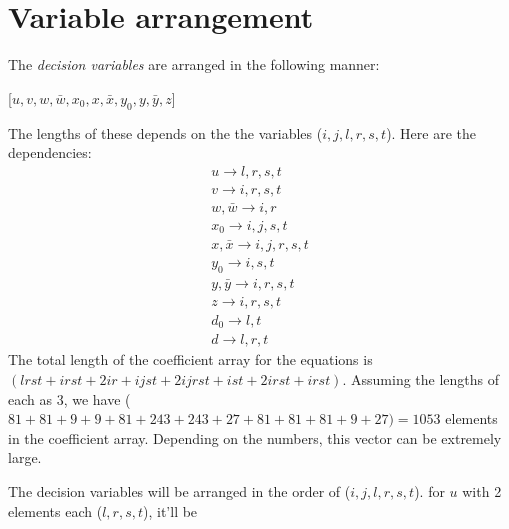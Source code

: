 \documentclass[11pt]{article}
\begin{document}
\section{Variable arrangement}
The \textit{decision variables} are arranged in the following manner:\\
\begin{center}
[$u, v, w, \bar{w}, x_0, x, \bar{x}, y_0, y, \bar{y}, z$]\\
\end{center}

\par \noindent The lengths of these depends on the the variables ($i, j, l, r, s, t$). Here are the dependencies:\\
\begin{align}
u \rightarrow l, r, s, t\\
v \rightarrow i, r, s, t\\
w, \bar{w} \rightarrow i, r\\
x_0 \rightarrow i,j,s,t\\
x, \bar{x}  \rightarrow i, j, r, s, t\\
y_0 \rightarrow i,s,t\\
y, \bar{y} \rightarrow i,r,s,t\\
z \rightarrow i, r, s, t\\
d_0 \rightarrow l, t\\
d \rightarrow l, r, t
\end{align}
The total length of the coefficient array for the equations is $(lrst + irst + 2ir + ijst + 2ijrst + ist + 2irst + irst)$. Assuming  the lengths of each as $3$, we have ($81+ 81 +9 + 9+ 81 +243 +243 + 27 + 81 + 81 +81 + 9 + 27)= 1053$ elements in the coefficient array. Depending on the numbers, this vector can be extremely large.

\par The decision variables will be arranged in the order of ($i, j, l, r, s, t$). for $u$ with 2 elements each ($l,r,s,t$), it'll be 
\begin{align}
[u^{1}_{1,1}(1),  u^2_{1,1}(1), u^1_{2,1}(1), u^2_{2,1}(1), u^{1}_{1,2}(1),  u^2_{1,2}(1), u^1_{2,2}(1), u^2_{2,2}(1), \\ \nonumber
u^{1}_{1,1}(2),  u^2_{1,1}(2), u^1_{2,1}(2), u^2_{2,1}(2), u^{1}_{1,2}(2),  u^2_{1,2}(2), u^1_{2,2}(2), u^2_{2,2}(2),\\
v^{1}_{1,1}(1),  v^2_{1,1}(1), v^1_{2,1}(1), v^2_{2,1}(1), v^{1}_{1,2}(1),  v^2_{1,2}(1), v^1_{2,2}(1), v^2_{2,2}(1), \\ \nonumber
v^{1}_{1,1}(2),  v^2_{1,1}(2), v^1_{2,1}(2), v^2_{2,1}(2), v^{1}_{1,2}(2),  v^2_{1,2}(2), v^1_{2,2}(2), v^2_{2,2}(2),\\w^1_1, w^2_1, w^1_2, w^2_2, \bar{w}^1_1...............................]\nonumber
\end{align}
\end{document}
